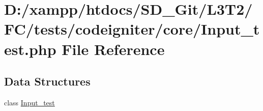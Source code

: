\hypertarget{_input__test_8php}{}\section{D\+:/xampp/htdocs/\+S\+D\+\_\+\+Git/\+L3\+T2/\+F\+C/tests/codeigniter/core/\+Input\+\_\+test.php File Reference}
\label{_input__test_8php}
\subsection*{Data Structures}
\begin{DoxyCompactItemize}
\item 
class \hyperlink{class_input__test}{Input\+\_\+test}
\end{DoxyCompactItemize}
